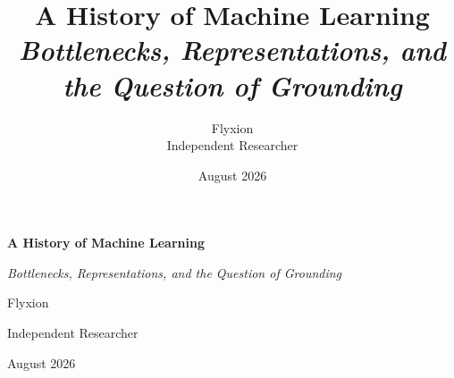 \documentclass[11pt,oneside]{book}
\title{\textbf{A History of Machine Learning}\\[0.5em]
  \large\emph{Bottlenecks, Representations, and the Question of Grounding}}
\author{Flyxion \\ \small Independent Researcher}
\date{August 2026}
\begin{document}
\frontmatter

\begin{titlepage}
\centering
\vspace*{3cm}
{\Huge\bfseries A History of Machine Learning\par}
\vspace{1em}
{\Large\emph{Bottlenecks, Representations, and the Question of Grounding}\par}
\vspace{4em}
{\Large Flyxion\par}
\vspace{0.3em}
{\normalsize Independent Researcher\par}
\vfill
{\normalsize August 2026\par}
\vspace{2cm}
\end{titlepage}

\tableofcontents

\mainmatter


















\end{document}
